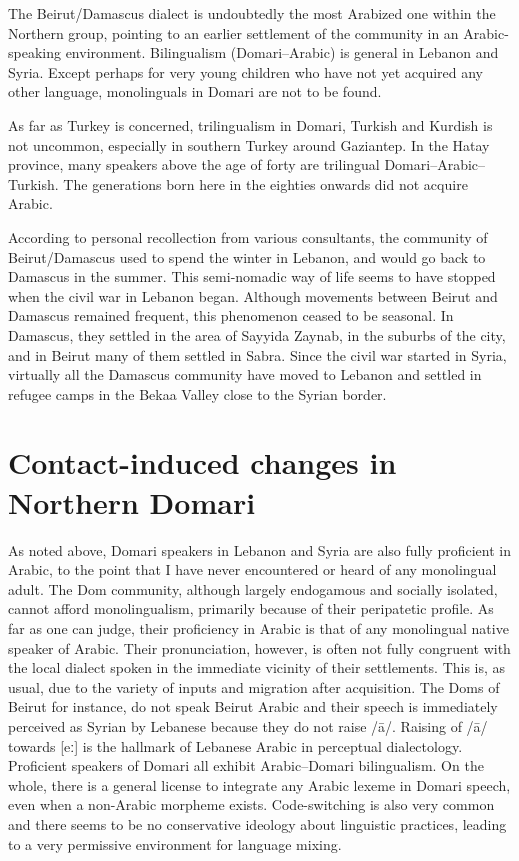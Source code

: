 \documentclass[output=paper]{langsci/langscibook}
\begin{document}
The Beirut/Damascus dialect is undoubtedly the most Arabized one within the Northern group, pointing to an earlier settlement of the community in an Arabic-speaking environment. Bilingualism (Domari--Arabic) is general in Lebanon and Syria. Except perhaps for very young children who have not yet acquired any other language, monolinguals in Domari are not to be found.

As far as Turkey is concerned, trilingualism in Domari, Turkish and Kurdish is not uncommon, especially in southern Turkey around Gaziantep. In the Hatay province, many speakers above the age of forty are trilingual Domari--Arabic--Turkish. The generations born here in the eighties onwards did not acquire Arabic. 

According to personal recollection from various consultants, the community of Beirut/Damascus used to spend the winter in Lebanon, and would go back to Damascus in the summer. This semi-nomadic way of life seems to have stopped when the civil war in Lebanon began. Although movements between Beirut and Damascus remained frequent, this phenomenon ceased to be seasonal. In Damascus, they settled in the area of Sayyida Zaynab, in the suburbs of the city, and in Beirut many of them settled in Sabra. Since the civil war started in Syria, virtually all the Damascus community have moved to Lebanon and settled in refugee camps in the Bekaa Valley close to the Syrian border. 

\section{Contact-induced changes in Northern Domari}

As noted above, Domari speakers in Lebanon and Syria are also fully proficient in Arabic, to the point that I have never encountered or heard of any monolingual adult. The Dom community, although largely endogamous and socially isolated, cannot afford monolingualism, primarily because of their peripatetic profile. As far as one can judge, their proficiency in Arabic is that of any monolingual native speaker of Arabic. Their pronunciation, however, is often not fully congruent with the local dialect spoken in the immediate vicinity of their settlements. This is, as usual, due to the variety of inputs and migration after acquisition. The Doms of Beirut for instance, do not speak Beirut Arabic and their speech is immediately perceived as Syrian by Lebanese because they do not raise /ā/. Raising of /ā/ towards [eː] is the hallmark of Lebanese Arabic in perceptual dialectology. Proficient speakers of Domari all exhibit Arabic--Domari bilingualism. On the whole, there is a general license to integrate any Arabic lexeme in Domari speech, even when a non-Arabic morpheme exists. Code-switching is also very common and there seems to be no conservative ideology about linguistic practices, leading to a very permissive environment for language mixing.
\end{document}
